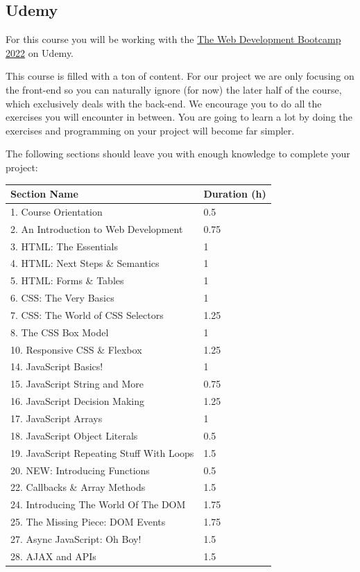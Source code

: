 \documentclass[
]{article}
\begin{document}
\hypertarget{udemy}{%
\subsection{Udemy}\label{udemy}}

For this course you will be working with the \href{https://www.udemy.com/course/the-web-developer-bootcamp/}{The Web Development Bootcamp 2022} on Udemy.

This course is filled with a ton of content. For our project we are only focusing on the front-end so you can naturally ignore (for now) the later half of the course, which exclusively deals with the back-end. We encourage you to do all the exercises you will encounter in between. You are going to learn a lot by doing the exercises and programming on your project will become far simpler.

The following sections should leave you with enough knowledge to complete your project:

\begin{longtable}[]{@{}ll@{}}
\toprule
Section Name & Duration (h) \\
\midrule
\endhead
1. Course Orientation & 0.5 \\
2. An Introduction to Web Development & 0.75 \\
3. HTML: The Essentials & 1 \\
4. HTML: Next Steps \& Semantics & 1 \\
5. HTML: Forms \& Tables & 1 \\
6. CSS: The Very Basics & 1 \\
7. CSS: The World of CSS Selectors & 1.25 \\
8. The CSS Box Model & 1 \\
10. Responsive CSS \& Flexbox & 1.25 \\
14. JavaScript Basics! & 1 \\
15. JavaScript String and More & 0.75 \\
16. JavaScript Decision Making & 1.25 \\
17. JavaScript Arrays & 1 \\
18. JavaScript Object Literals & 0.5 \\
19. JavaScript Repeating Stuff With Loops & 1.5 \\
20. NEW: Introducing Functions & 0.5 \\
22. Callbacks \& Array Methods & 1.5 \\
24. Introducing The World Of The DOM & 1.75 \\
25. The Missing Piece: DOM Events & 1.75 \\
27. Async JavaScript: Oh Boy! & 1.5 \\
28. AJAX and APIs & 1.5 \\
\bottomrule
\end{longtable}
\end{document}
